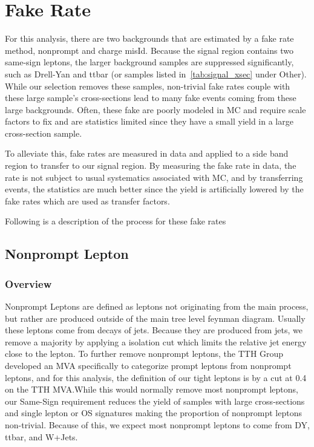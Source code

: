 \graphicspath{{images/fake_rate}}

\section{Fake Rate}\label{sec:fake_rate}
For this analysis, there are two backgrounds that are estimated by a fake rate method, nonprompt and charge misId. Because the signal region contains two same-sign leptons, the larger background samples are suppressed significantly, such as Drell-Yan and ttbar (or samples listed in~\ref{tab:signal_xsec} under Other). While our selection removes these samples, non-trivial fake rates couple with these large sample's cross-sections lead to many fake events coming from these large backgrounds. Often, these fake are poorly modeled in MC and require scale factors to fix and are statistics limited since they have a small yield in a large cross-section sample.

To alleviate this, fake rates are measured in data and applied to a side band region to transfer to our signal region. By measuring the fake rate in data, the rate is not subject to usual systematics associated with MC, and by transferring events, the statistics are much better since the yield is artificially lowered by the fake rates which are used as transfer factors.

Following is a description of the process for these fake rates

\subsection{Nonprompt Lepton}\label{sec:nonprompt_lepton}

\subsubsection{Overview}\label{sec:nonprompt:overview}
Nonprompt Leptons are defined as leptons not originating from the main process, but rather are produced outside of the main tree level feynman diagram. Usually these leptons come from decays of jets. Because they are produced from jets, we remove a majority by applying a isolation cut which limits the relative jet energy close to the lepton. To further remove nonprompt leptons, the TTH Group developed an MVA specifically to categorize prompt leptons from nonprompt leptons, and for this analysis, the definition of our tight leptons is by a cut at 0.4 on the TTH MVA.\@ While this would normally remove most nonprompt leptons, our Same-Sign requirement reduces the yield of samples with large cross-sections and single lepton or OS signatures making the proportion of nonprompt leptons non-trivial. Because of this, we expect most nonprompt leptons to come from DY, ttbar, and W+Jets.

